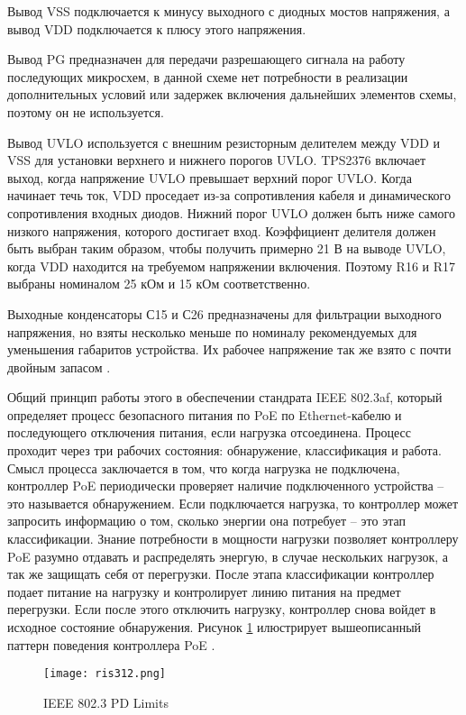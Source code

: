 Вывод VSS подключается к минусу выходного с диодных мостов напряжения, 
а вывод VDD подключается к плюсу этого напряжения.

Вывод PG предназначен для передачи разрешающего сигнала на работу последующих микросхем,
в данной схеме нет потребности в реализации дополнительных условий или задержек включения
дальнейших элементов схемы, поэтому он не используется.

Вывод UVLO используется с внешним резисторным делителем между VDD и VSS для установки 
верхнего и нижнего порогов UVLO. TPS2376 включает выход, когда напряжение UVLO превышает верхний 
порог UVLO. Когда начинает течь ток, VDD проседает из-за сопротивления кабеля и динамического 
сопротивления входных диодов. Нижний порог UVLO должен быть ниже самого низкого напряжения, 
которого достигает вход. Коэффициент делителя должен быть выбран таким образом, 
чтобы получить примерно 21 В на выводе UVLO, когда VDD находится на требуемом 
напряжении включения. Поэтому R16 и R17 выбраны номиналом 25 кОм и 15 кОм соответственно.

Выходные конденсаторы С15 и С26 предназначены для фильтрации выходного напряжения, но взяты 
несколько меньше по номиналу рекомендуемых для уменьшения габаритов устройства. Их рабочее
напряжение так же взято с почти двойным запасом \cite{TPS2376:datasheet}.

Общий принцип работы этого в обеспечении стандрата IEEE 802.3af, который определяет 
процесс безопасного питания по PoE по Ethernet-кабелю и последующего отключения питания, 
если нагрузка отсоединена. Процесс проходит через три рабочих состояния: обнаружение, 
классификация и работа. Смысл процесса заключается в том, что когда нагрузка не подключена,
контроллер PoE периодически проверяет наличие подключенного устройства -- это называется 
обнаружением. Если подключается нагрузка, то контроллер может запросить информацию о том,
сколько энергии она потребует -- это этап классификации. Знание потребности в мощности нагрузки 
позволяет контроллеру PoE разумно отдавать и распределять энергую, в случае нескольких нагрузок,
а так же защищать себя от перегрузки. После этапа классификации контроллер подает питание на 
нагрузку и контролирует линию питания на предмет перегрузки. Если после этого отключить нагрузку,
контроллер снова войдет в исходное состояние обнаружения. Рисунок \ref{ris:312}  илюстрирует 
вышеописанный паттерн поведения контроллера PoE \cite{TPS2376:datasheet}.

\begin{figure}[H]
    \centering
    \texttt{[image: ris312.png]}
    \caption{IEEE 802.3 PD Limits}
    \label{ris:312}
\end{figure}

